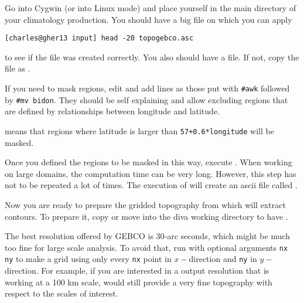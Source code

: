%
%
%
%

Go into Cygwin (or into Linux mode) and place yourself in the main directory of your climatology production. You should have a big  file on which you can apply

\begin{lstlisting}[style=Bash]
[charles@gher13 input] head -20 topogebco.asc
\end{lstlisting}

to see if the file was created correctly. You also should have a  file. If not, copy the  file as .

If you need to mask regions, edit  and add lines as those put with {\tt \#awk} followed by {\tt \#mv bidon}. They should be self explaining and allow excluding regions that are defined by relationships between longitude and latitude. 

 means that regions where latitude is larger than \texttt{57+0.6*longitude} will be masked.

Once you defined the regions to be masked in this way, execute . When working on large domains, the computation time can be very long. However, this step has not to be repeated a lot of times. The execution of  will create an ascii file called 
.

Now you are ready to prepare the gridded topography  from which \diva will extract contours. To prepare it,
copy or move  into the diva working directory to have .

The best resolution offered by GEBCO is 30-arc seconds, which might be much too fine for large scale analysis. To avoid that, run
 with optional arguments {\tt nx ny} to make a grid using only every {\tt nx} point in $x-$direction and {\tt ny} in $y-$direction. For example, if you are interested in a \diva output resolution that is working at a 100 km scale,  would still provide a very fine topography with respect to the scales of interest.

